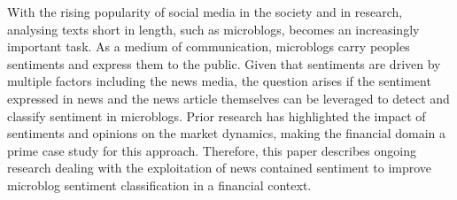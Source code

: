 With the rising popularity of social media in the society and in research, analysing texts short in length, such as microblogs, becomes an increasingly important task. As a medium of communication, microblogs carry peoples sentiments and express them to the public. Given that sentiments are driven by multiple factors including the news media, the question arises if the sentiment expressed in news and the news article themselves can be leveraged to detect and classify sentiment in microblogs. Prior research has highlighted the impact of sentiments and opinions on the market dynamics, making the financial domain a prime case study for this approach. Therefore, this paper describes ongoing research dealing with the exploitation of news contained sentiment to improve microblog sentiment classification in a financial context.
